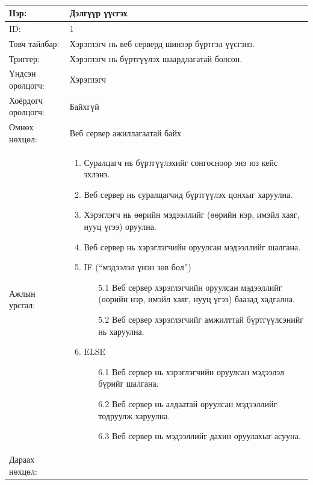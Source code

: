 \begin{center}
	\begin{table}[!htbp]
		\caption{}
		\begin{tabular}{|p{4cm}|p{11cm}|}
		\hline
			Нэр: & Дэлгүүр үүсгэх \\
		\hline
			ID: & 1 \\
		\hline
			Товч тайлбар: & Хэрэглэгч нь веб серверд шинээр бүртгэл үүсгэнэ. \\
		\hline
			Триггер: & Хэрэглэгч нь бүртгүүлэх шаардлагатай болсон. \\
		\hline
			Үндсэн оролцогч: & Хэрэглэгч \\
		\hline
			Хоёрдогч оролцогч: & Байхгүй  \\
		\hline
			Өмнөх нөхцөл: &  Веб сервер ажиллагаатай байх\\
		\hline
			Ажлын урсгал: & \begin{enumerate}
						 	\item Суралцагч нь бүртгүүлэхийг сонгосноор энэ юз кейс эхлэнэ. 
						 	\item Веб сервер нь суралцагчид бүртгүүлэх цонхыг харуулна. 
						 	\item Хэрэглэгч нь өөрийн мэдээллийг (өөрийн нэр, имэйл хаяг, нууц үгээ) оруулна. 
						 	\item Веб сервер нь хэрэглэгчийн оруулсан мэдээллийг шалгана. 
						 	\item IF (“мэдээлэл үнэн зөв бол”)
							 	\begin{enumerate}
							 		\item[5.1] Веб сервер хэрэглэгчийн оруулсан мэдээллийг (өөрийн нэр, имэйл хаяг, нууц үгээ) баазад хадгална.
							 		\item[5.2] Веб сервер хэрэглэгчийг амжилттай бүртгүүлсэнийг нь харуулна. 
							 	\end{enumerate}
						 	\item ELSE
							 	\begin{enumerate}
							 		\item[6.1] Веб сервер нь хэрэглэгчийн оруулсан мэдээлэл бүрийг шалгана.  
							 		\item[6.2] Веб сервер нь алдаатай оруулсан мэдээллийг тодруулж харуулна. 
							 		\item[6.3] Веб сервер нь мэдээллийг дахин оруулахыг асууна. 
							 	\end{enumerate}
						  \end{enumerate}
\\					  \hline
				Дараах нөхцөл: &
				 \begin{enumerate}

\end{enumerate}
\end{tabular}
\end{table}
\end{center}
